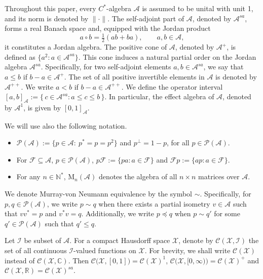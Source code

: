 \documentclass[12pt]{amsart}
\theoremstyle{definition}
\theoremstyle{remark}
\numberwithin{equation}{section}
\begin{document}
 
 Throughout this paper, every $C^*$-algebra $\mathcal{A}$ is assumed to be unital with unit 1, and its norm is denoted by $\| \cdot\|$. The self-adjoint part of $\mathcal{A}$, denoted by $\mathcal{A}^{sa}$, forms a real Banach space and, equipped with the Jordan product $$a \circ b = \tfrac{1}{2}(ab + ba),\qquad a,b\in \mathcal{A},$$ it constitutes a Jordan algebra. The positive cone of $\mathcal{A}$, denoted by $\mathcal{A}^+$, is defined as $\{a^2 : a \in \mathcal{A}^{sa}\}$. This cone induces a natural partial order on the Jordan algebra   $\mathcal{A}^{sa}$. Specifically, for two self-adjoint elements $a, b \in \mathcal{A}^{sa}$, we say that $a \leq b$ if $b - a \in \mathcal{A}^+$. The set of all positive invertible elements in $\mathcal{A}$ is denoted by $\mathcal{A}^{++}$. We write $a<b$ if $b-a\in\mathcal{A}^{++}$. We define the operator interval $[a,b]_{\mathcal{A}} := \{\, c \in \mathcal{A}^{sa} : a \leq c \leq b \,\}$.  
 In particular, the effect algebra of $\mathcal{A}$, denoted by $\mathcal{A}^{1}$, is given by $[0,1]_{\mathcal{A}}$.
 
 

  We will use also the following notation. 
 \begin{itemize}
 	\item  $\mathcal{P(A)}:=\{p\in\mathcal{A}:\ p^*=p=p^2\}$ and $p^\perp=1-p$, for all $p\in \mathcal{P(A)}$.
 	\item  For $\mathcal{F}\subseteq\mathcal{A}$, $p\in \mathcal{P(A)}$,  $p\mathcal{F}:=\{pa: a\in \mathcal{F}\}$ and  $\mathcal{F}p:=\{ap: a\in \mathcal{F}\}$.
 	\item For any $n\in \mathbb{N}^*$, $\mathrm{M}_n(\mathcal{A})$ denotes the algebra of all $n\times n$ matrices over $\mathcal{A}$.
 \end{itemize}
We denote  Murray-von Neumann equivalence by the symbol $\sim$. Specifically, for $p,q\in\mathcal{P(A)}$, we write $p \sim q$ when there exists a partial isometry $v\in\mathcal{A}$ such that $vv^* = p$ and $v^*v = q$. Additionally, we write $p \preceq q$ when  $p\sim q'$ for some $q'\in\mathcal{P(A)}$ such that $q'\leq q$.
 
 Let  $\mathcal{I}$ be  subset of $\mathcal{A}$. For a compact Hausdorff space $\mathcal{X}$, denote by $\mathcal{C}(\mathcal{X}, \mathcal{I})$ the set of all continuous $\mathcal{I}$-valued functions on $\mathcal{X}$. For brevity, we shall write $\mathcal{C}(\mathcal{X})$ instead of $\mathcal{C}(\mathcal{X}, \mathbb{C})$. Then $\mathcal{C}\big(\mathcal{X}, [0,1]\big)=\mathcal{C}(\mathcal{X})^{1}$, $\mathcal{C}\big(\mathcal{X}, [0,\infty)\big)=\mathcal{C}(\mathcal{X})^+$ and $\mathcal{C}(\mathcal{X}, \mathbb{R})=\mathcal{C}(\mathcal{X})^{sa}$.
 
\end{document}
